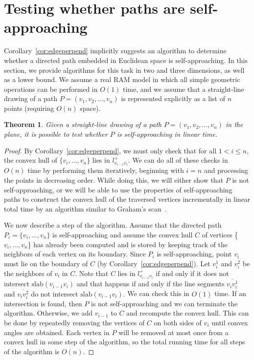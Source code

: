 \documentclass[11pt]{article}
\newcommand{\perpslab}[1]{\mathrm{slab}(#1)}
\newtheorem{theorem}{Theorem}
\newcommand{\ignore}[1]{}
\newcommand{\changeA}[1]{{#1}}
\begin{document}
\section{Testing whether paths are self-approaching}
\label{sec:testingPaths}
Corollary~\ref{cor:edgeperpend} implicitly suggests an algorithm to determine whether a directed path embedded in Euclidean space is self-approaching.  In this section, we provide \ignore{improved} algorithms for this task in two and three dimensions, as well as a lower bound.  We assume a real RAM model in which all simple geometric operations can be performed in $O(1)$ time, and we assume that a straight-line drawing of a path $P=(v_1,v_2,\ldots,v_n)$ is represented explicitly as a list of $n$ points (requiring $O(n)$ space).
\begin{theorem}
\label{thm:pathSolver}
Given a straight-line drawing of a path $P=(v_1,v_2,\ldots,v_n)$ in the plane, it is possible to test whether $P$ is self-approaching in linear time.
\end{theorem}
\begin{proof}
By Corollary~\ref{cor:edgeperpend}, we must only check that for all $1<i\leq n$, the convex hull of $\{v_{i},\ldots , v_n\}$ lies in $l_{v_{i-1}v_i}^+$.  We can do all of these checks in $O(n)$ time by performing them iteratively, beginning with $i=n$ and processing the points in decreasing order.  While doing this, we will either show that $P$ is not self-approaching, or we will be able to use the properties of self-approaching paths to construct the convex hull of the traversed vertices incrementally in linear total time by an algorithm similar to Graham's scan~\cite{Graham}.

We now describe a step of the algorithm.  Assume that the directed path $P_i = \{v_i,\ldots,v_n\}$ is self-approaching and assume the convex hull $C$ of vertices \{$v_i,\ldots , v_n$\} has already been computed and is stored by keeping track of the neighbors of each vertex on its boundary.  Since $P_i$ is self-approaching, point $v_i$ must lie on the boundary of $C$ (by Corollary~\ref{cor:edgeperpend}).  Let $v_i^1$ and $v_i^2$ be the neighbors of $v_i$ in $C$.
\changeA{Note that $C$ lies in $l_{v_{i-1}v_i}^+$ if and only if it does not intersect $\perpslab{v_{i-1}v_i}$ and that happens if and only if the line segments $\overline{v_iv_i^1}$ and $\overline{v_iv_i^2}$ do not intersect $\perpslab{v_{i-1}v_i}$.}
We can check this in $O(1)$ time.
If an intersection is found, then $P$ is not self-approaching and we can terminate the algorithm.  Otherwise, we add $v_{i-1}$ to $C$ and recompute the convex hull.  This can be done by repeatedly removing the vertices of $C$ on both sides of $v_i$ until convex angles are obtained\ignore{, after which the convex hull of $C \cup \{v_{i-1}\}$ will remain}.  Each vertex in $P$ will be removed at most once from a convex hull in some step of the algorithm, so the total running time for all steps of the algorithm is $O(n)$.
\end{proof}
\end{document}
